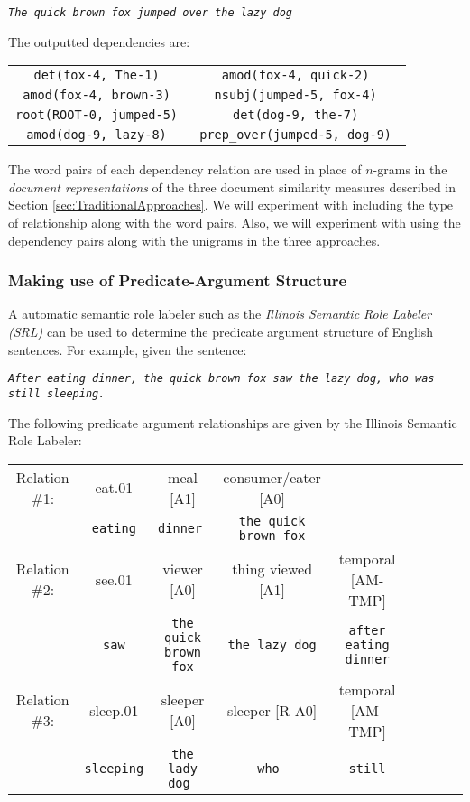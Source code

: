 \documentclass[11pt]{article}
\begin{document}
\begin{center}
\it \tt  \emph{The quick brown fox jumped over the lazy dog}
\end{center}

The outputted dependencies are:

\begin{center}
\begin{tabular}{cc}
\tt  det(fox-4, The-1) & \tt amod(fox-4, quick-2) \\
\tt amod(fox-4, brown-3) & \tt nsubj(jumped-5, fox-4) \\
\tt root(ROOT-0, jumped-5) & \tt det(dog-9, the-7) \\
\tt amod(dog-9, lazy-8) & \tt prep\_over(jumped-5, dog-9) \\
\end{tabular}
\end{center}

The word pairs of each dependency relation are used in place of $n$-grams in the \emph{document representations} of the three document similarity measures described in Section \ref{sec:TraditionalApproaches}. We will experiment with including the type of relationship along with the word pairs. Also, we will experiment with using the dependency pairs along with the unigrams in the three approaches. 


\subsubsection{Making use of Predicate-Argument Structure} \label{sec:PredicateArgument}

A automatic semantic role labeler such as the {\it Illinois Semantic Role Labeler (SRL)} \cite{Punyakanok2008} can be used to determine the predicate argument structure of English sentences. For example, given the sentence:  

\begin{center}
\tt \emph{After eating dinner, the quick brown fox saw the lazy dog, who was still sleeping.}
\end{center}

The following predicate argument relationships are given by the Illinois Semantic Role Labeler:

\begin{center}
\begin{tabular}{ccccccccc}
Relation \#1: & eat.01 & meal [A1] & consumer/eater [A0]  \\
& {\tt eating} & \tt dinner & {\tt the quick brown fox} \\
Relation \#2:  & see.01 & viewer [A0] & thing viewed [A1] & temporal [AM-TMP] \\
& {\tt saw} & {\tt the quick brown fox} & {\tt the lazy dog} & {\tt after eating dinner} \\
Relation \#3: & sleep.01 & sleeper [A0] & sleeper [R-A0] & temporal [AM-TMP] \\
& {\tt sleeping} & \tt the lady dog & \tt who & \tt still
\end{tabular}
\end{center}
\end{document}

